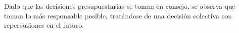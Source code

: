 Dado que las decisiones presupuestarias se toman en consejo, se observa que toman lo más responsable posible, tratándose de una decisión colectiva con repercusiones en el futuro.
